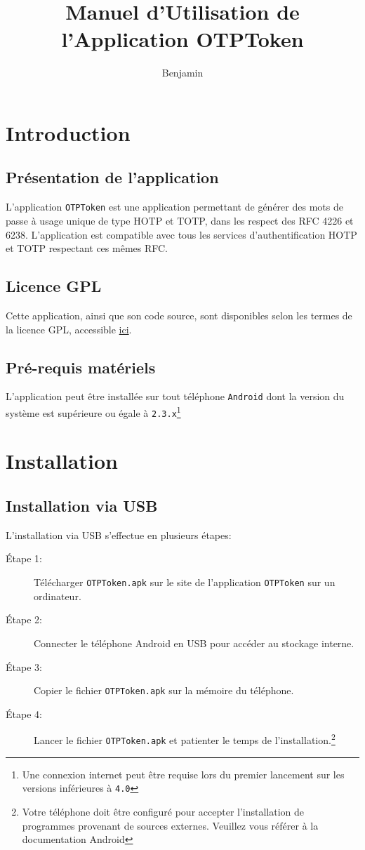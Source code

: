 \documentclass{../../../../res/univ-projet}
\author{Benjamin \bsc{Zigh}}
\title{Manuel d'Utilisation de l'Application OTPToken}
\begin{document}
\maketitle
\newpage
\tableofcontents
\newpage

\section{Introduction}
\subsection{Présentation de l'application}

L'application \verb$OTPToken$ est une application permettant de générer des mots de passe à usage unique de type HOTP et TOTP, dans les respect des RFC 4226 et 6238. L'application est compatible avec tous les services d'authentification HOTP et TOTP respectant ces mêmes RFC.

\subsection{Licence GPL}
Cette application, ainsi que son code source, sont disponibles selon les termes de la licence GPL, accessible \href{http://opensource.org/licenses/GPL-3.0}{ici}.

\subsection{Pré-requis matériels}
L'application peut être installée sur tout téléphone \verb$Android$ dont la version du système est supérieure ou égale à \verb$2.3.x$\footnote{Une connexion internet peut être requise lors du premier lancement sur les versions inférieures à \verb?4.0?}

\section{Installation}
\subsection{Installation via USB}
L'installation via USB s'effectue en plusieurs étapes:
\newline
\begin{description}
\item[Étape 1:] Télécharger \verb$OTPToken.apk$ sur le site de l'application \verb$OTPToken$ sur un ordinateur.
\item[Étape 2:] Connecter le téléphone Android en USB pour accéder au stockage interne.
\item[Étape 3:] Copier le fichier \verb$OTPToken.apk$ sur la mémoire du téléphone.
\item[Étape 4:] Lancer le fichier \verb$OTPToken.apk$ et patienter le temps de l'installation.\footnote{Votre téléphone doit être configuré pour accepter l'installation de programmes provenant de sources externes. Veuillez vous référer à la documentation Android}
\end{description}
\end{document}

